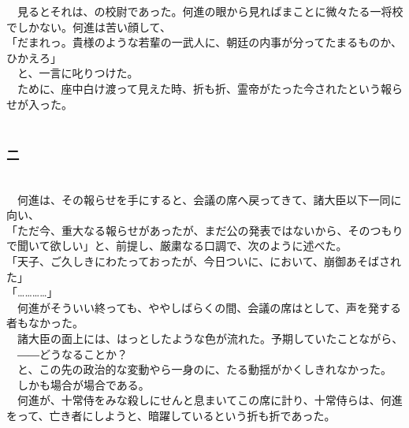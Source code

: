 \documentclass[
  paper=a5,
  fontsize=10pt,
  jafontsize=9.5pt,
  tate,                  %
  open_bracket_pos=nibu, %
]{jlreq}
\begin{document}
　見るとそれは、の校尉であった。何進の眼から見ればまことに微々たる一将校でしかない。何進は苦い顔して、\\


「だまれっ。貴様のような若輩の一武人に、朝廷の内事が分ってたまるものか、ひかえろ」\\


　と、一言に叱りつけた。\\


　ために、座中白け渡って見えた時、折も折、霊帝がたった今されたという報らせが入った。\\

\\

\subsubsection{二}

\\


　何進は、その報らせを手にすると、会議の席へ戻ってきて、諸大臣以下一同に向い、\\


「ただ今、重大なる報らせがあったが、まだ公の発表ではないから、そのつもりで聞いて欲しい」と、前提し、厳粛なる口調で、次のように述べた。\\


「天子、ご久しきにわたっておったが、今日ついに、において、崩御あそばされた」\\


「…………」\\


　何進がそういい終っても、ややしばらくの間、会議の席はとして、声を発する者もなかった。\\


　諸大臣の面上には、はっとしたような色が流れた。予期していたことながら、\\


　――どうなることか？\\


　と、この先の政治的な変動やら一身のに、たる動揺がかくしきれなかった。\\


　しかも場合が場合である。\\


　何進が、十常侍をみな殺しにせんと息まいてこの席に計り、十常侍らは、何進をって、亡き者にしようと、暗躍しているという折も折であった。\\
\end{document}
